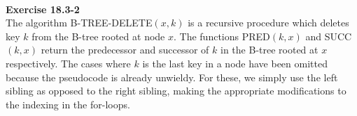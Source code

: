 \documentclass{article}
\begin{document}
\\

\noindent\textbf{Exercise 18.3-2}\\

The algorithm B-TREE-DELETE$(x,k)$ is a recursive procedure which deletes key $k$ from the B-tree rooted at node $x$. The functions PRED$(k,x)$ and SUCC$(k,x)$ return the predecessor and successor of $k$ in the B-tree rooted at $x$ respectively.  The cases where $k$ is the last key in a node have been omitted because the pseudocode is already unwieldy.  For these, we simply use the left sibling as opposed to the right sibling, making the appropriate modifications to the indexing in the for-loops. \\
\end{document}
